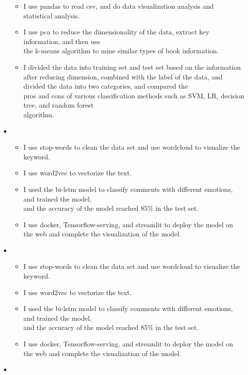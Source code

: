 \begin{itemize}[leftmargin=*]
{\begin{itemize}
       \item I use pandas to read csv, and do data visualization analysis and statistical analysis.
       \item I use pca to reduce the dimensionality of the data, extract key information, and then use\\ the k-means algorithm to mine similar types of book information.
       \item I divided the data into training set and test set based on the information after reducing dimension, combined with the label of the data, and divided the data into two categories, and compared the\\ pros and cons of various classification methods such as SVM, LR, decision tree, and random forest\\ algorithm.
      \end{itemize}
      }
    \item
      {\small
      \begin{itemize}
      
       \item I use stop-words to clean the data set and use wordcloud to visualize the keyword. 	
       \item I use word2vec to vectorize the text.
       \item I used the bi-lstm model to classify comments with different emotions, and trained the model, \\and the accuracy of the model reached 85\% in the test set. 
       \item I use docker, Tensorflow-serving, and streamlit to deploy the model on the web and complete the visualization of the model.
      \end{itemize}
      }
    \item
      {\small
      \begin{itemize}
      
       \item I use stop-words to clean the data set and use wordcloud to visualize the keyword. 	
       \item I use word2vec to vectorize the text.
       \item I used the bi-lstm model to classify comments with different emotions, and trained the model, \\and the accuracy of the model reached 85\% in the test set. 
       \item I use docker, Tensorflow-serving, and streamlit to deploy the model on the web and complete the visualization of the model.
      \end{itemize}
      }
    \item
      {\small
      \begin{itemize}
      

\end{itemize}}
\end{itemize}
